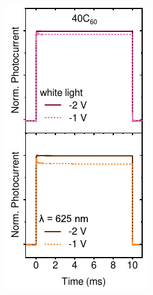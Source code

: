 \begin{figure}[htbp]
\begin{subfigure}{0.24\textwidth}
        \caption{}
        \label{}
    \end{subfigure}
    \hfill
    \begin{subfigure}{0.24\textwidth}
        \centering
        \includegraphics[width=\textwidth]{chapters/transport_layers/images/TPC_40C60.pdf}
        \caption{}
        \label{}
    \end{subfigure}
    

\end{figure}
